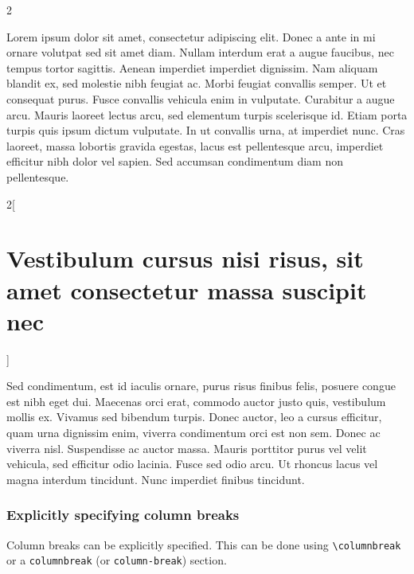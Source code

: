 \documentclass[
]{article}
\begin{document}
{\setlength{\columnseprule}{ 1pt}
\renewcommand{\columnseprulecolor}{\color{black}}
\begin{multicols}{2}

Lorem ipsum dolor sit amet, consectetur adipiscing elit. Donec a ante in
mi ornare volutpat sed sit amet diam. Nullam interdum erat a augue
faucibus, nec tempus tortor sagittis. Aenean imperdiet imperdiet
dignissim. Nam aliquam blandit ex, sed molestie nibh feugiat ac. Morbi
feugiat convallis semper. Ut et consequat purus. Fusce convallis
vehicula enim in vulputate. Curabitur a augue arcu. Mauris laoreet
lectus arcu, sed elementum turpis scelerisque id. Etiam porta turpis
quis ipsum dictum vulputate. In ut convallis urna, at imperdiet nunc.
Cras laoreet, massa lobortis gravida egestas, lacus est pellentesque
arcu, imperdiet efficitur nibh dolor vel sapien. Sed accumsan
condimentum diam non pellentesque.

\end{multicols}
\begin{multicols}{2}[\hypertarget{vestibulum-cursus-nisi-risus-sit-amet-consectetur-massa-suscipit-nec}{%
\section{Vestibulum cursus nisi risus, sit amet consectetur massa
suscipit
nec}\label{vestibulum-cursus-nisi-risus-sit-amet-consectetur-massa-suscipit-nec}}]

Sed condimentum, est id iaculis ornare, purus risus finibus felis,
posuere congue est nibh eget dui. Maecenas orci erat, commodo auctor
justo quis, vestibulum mollis ex. Vivamus sed bibendum turpis. Donec
auctor, leo a cursus efficitur, quam urna dignissim enim, viverra
condimentum orci est non sem. Donec ac viverra nisl. Suspendisse ac
auctor massa. Mauris porttitor purus vel velit vehicula, sed efficitur
odio lacinia. Fusce sed odio arcu. Ut rhoncus lacus vel magna interdum
tincidunt. Nunc imperdiet finibus tincidunt.

\end{multicols}
}

\hypertarget{explicitly-specifying-column-breaks}{%
\subsubsection{Explicitly specifying column
breaks}\label{explicitly-specifying-column-breaks}}

Column breaks can be explicitly specified. This can be done using
\texttt{\textbackslash{}columnbreak} or a \texttt{columnbreak} (or
\texttt{column-break}) section.
\end{document}
